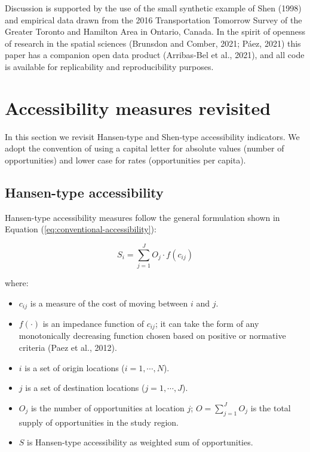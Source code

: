 \documentclass[]{elsarticle} %
\providecommand{\tightlist}{%
  \setlength{\itemsep}{0pt}\setlength{\parskip}{0pt}}
\begin{document}
Discussion is supported by the use of the small synthetic example of
Shen (1998) and empirical data drawn from the 2016 Transportation
Tomorrow Survey of the Greater Toronto and Hamilton Area in Ontario,
Canada. In the spirit of openness of research in the spatial sciences
(Brunsdon and Comber, 2021; Páez, 2021) this paper has a companion open
data product (Arribas-Bel et al., 2021), and all code is available for
replicability and reproducibility purposes.

\hypertarget{background}{%
\section{Accessibility measures revisited}\label{background}}

In this section we revisit Hansen-type and Shen-type accessibility
indicators. We adopt the convention of using a capital letter for
absolute values (number of opportunities) and lower case for rates
(opportunities per capita).

\hypertarget{hansen-type-accessibility}{%
\subsection{Hansen-type accessibility}\label{hansen-type-accessibility}}

Hansen-type accessibility measures follow the general formulation shown
in Equation (\ref{eq:conventional-accessibility}):

\begin{equation}
\label{eq:conventional-accessibility}
S_i = \sum_{j=1}^JO_j \cdot f(c_{ij})
\end{equation}

\noindent where:

\begin{itemize}
\tightlist
\item
  \(c_{ij}\) is a measure of the cost of moving between \(i\) and \(j\).
\item
  \(f(\cdot)\) is an impedance function of \(c_{ij}\); it can take the
  form of any monotonically decreasing function chosen based on positive
  or normative criteria (Paez et al., 2012).
\item
  \(i\) is a set of origin locations (\(i = 1,\cdots,N\)).
\item
  \(j\) is a set of destination locations (\(j = 1,\cdots,J\)).
\item
  \(O_j\) is the number of opportunities at location \(j\);
  \(O = \sum_{j=1}^J O_j\) is the total supply of opportunities in the
  study region.
\item
  \(S\) is Hansen-type accessibility as weighted sum of opportunities.
\end{itemize}
\end{document}
